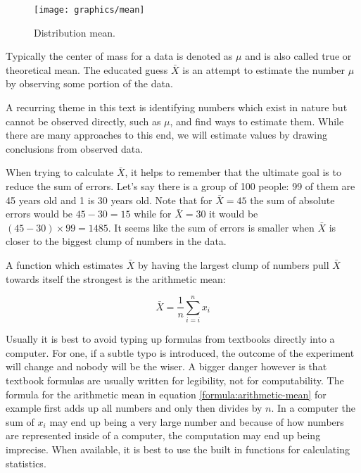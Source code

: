 \documentclass{tufte-book} %
\begin{document}
\begin{figure}
	\centering
	\texttt{[image: graphics/mean]}
	\label{img:mean}
	\caption{Distribution mean.}
\end{figure}

Typically the center of mass for a data is  denoted as $\mu$ and is also called true or theoretical mean. The educated guess $\bar{X}$ is an attempt to estimate the number $\mu$ by observing some portion of the data. 

\begin{tcolorbox}
	A recurring theme in this text is identifying numbers which exist in nature but cannot be observed directly, such as $\mu$, and find ways to estimate them. While there are many approaches to this end, we will estimate values by drawing conclusions from observed data.
\end{tcolorbox}

When trying to calculate $\bar{X}$, it helps to remember that the ultimate goal is to reduce the sum of errors. Let's say there is a group of 100 people: 99 of them are 45 years old and 1 is 30 years old. Note that for $\bar{X} = 45$ the sum of absolute errors would be $45 - 30 = 15$ while for $\bar{X} = 30$ it would be $(45 - 30) \times 99 = 1485$. It seems like the sum of errors is smaller when $\bar{X}$ is closer to the biggest clump of numbers in the data.

A function which estimates $\bar{X}$ by having the largest clump of numbers pull $\bar{X}$ towards itself the strongest is the arithmetic mean:

\begin{equation} \label{formula:arithmetic-mean}
	\bar{X} = \frac{1}{n} \sum_{i=i}^{n} x_i
\end{equation}

\begin{tcolorbox}
	Usually it is best to avoid typing up formulas from textbooks directly into a computer. For one, if a subtle typo is introduced, the outcome of the experiment will change and nobody will be the wiser. A bigger danger however is that textbook formulas are usually written for legibility, not for computability. The formula for the arithmetic mean in equation \ref{formula:arithmetic-mean} for example first adds up all numbers and only then divides by $n$. In a computer the sum of $x_i$ may end up being a very large number and because of how numbers are represented inside of a computer, the computation may end up being imprecise. When available, it is best to use the built in functions for calculating statistics.
\end{tcolorbox}
\end{document}
